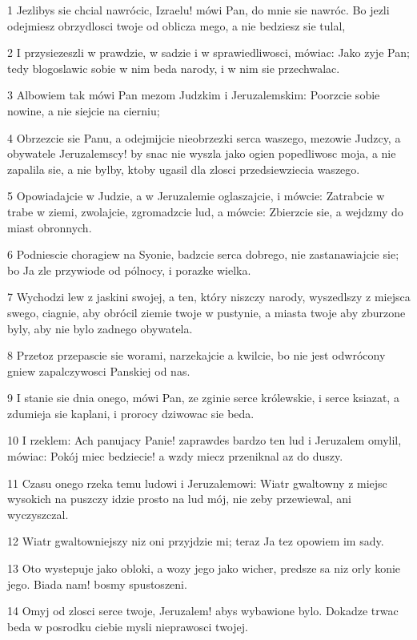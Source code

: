 \par 1 Jezlibys sie chcial nawrócic, Izraelu! mówi Pan, do mnie sie nawróc. Bo jezli odejmiesz obrzydlosci twoje od oblicza mego, a nie bedziesz sie tulal,
\par 2 I przysiezeszli w prawdzie, w sadzie i w sprawiedliwosci, mówiac: Jako zyje Pan; tedy blogoslawic sobie w nim beda narody, i w nim sie przechwalac.
\par 3 Albowiem tak mówi Pan mezom Judzkim i Jeruzalemskim: Poorzcie sobie nowine, a nie siejcie na cierniu;
\par 4 Obrzezcie sie Panu, a odejmijcie nieobrzezki serca waszego, mezowie Judzcy, a obywatele Jeruzalemscy! by snac nie wyszla jako ogien popedliwosc moja, a nie zapalila sie, a nie bylby, ktoby ugasil dla zlosci przedsiewziecia waszego.
\par 5 Opowiadajcie w Judzie, a w Jeruzalemie oglaszajcie, i mówcie: Zatrabcie w trabe w ziemi, zwolajcie, zgromadzcie lud, a mówcie: Zbierzcie sie, a wejdzmy do miast obronnych.
\par 6 Podniescie choragiew na Syonie, badzcie serca dobrego, nie zastanawiajcie sie; bo Ja zle przywiode od pólnocy, i porazke wielka.
\par 7 Wychodzi lew z jaskini swojej, a ten, który niszczy narody, wyszedlszy z miejsca swego, ciagnie, aby obrócil ziemie twoje w pustynie, a miasta twoje aby zburzone byly, aby nie bylo zadnego obywatela.
\par 8 Przetoz przepascie sie worami, narzekajcie a kwilcie, bo nie jest odwrócony gniew zapalczywosci Panskiej od nas.
\par 9 I stanie sie dnia onego, mówi Pan, ze zginie serce królewskie, i serce ksiazat, a zdumieja sie kaplani, i prorocy dziwowac sie beda.
\par 10 I rzeklem: Ach panujacy Panie! zaprawdes bardzo ten lud i Jeruzalem omylil, mówiac: Pokój miec bedziecie! a wzdy miecz przeniknal az do duszy.
\par 11 Czasu onego rzeka temu ludowi i Jeruzalemowi: Wiatr gwaltowny z miejsc wysokich na puszczy idzie prosto na lud mój, nie zeby przewiewal, ani wyczyszczal.
\par 12 Wiatr gwaltowniejszy niz oni przyjdzie mi; teraz Ja tez opowiem im sady.
\par 13 Oto wystepuje jako obloki, a wozy jego jako wicher, predsze sa niz orly konie jego. Biada nam! bosmy spustoszeni.
\par 14 Omyj od zlosci serce twoje, Jeruzalem! abys wybawione bylo. Dokadze trwac beda w posrodku ciebie mysli nieprawosci twojej.
